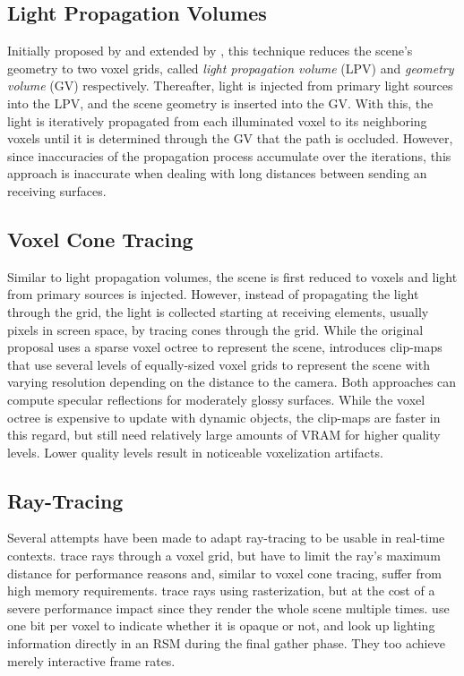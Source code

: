 \subsection{Light Propagation Volumes}

Initially proposed by \citet{Kaplanyan:2010:LPV} and extended by \citet{Kaplanyan:2010:LPV2}, this technique reduces the scene's geometry to two voxel grids, called \emph{light propagation volume} (LPV) and \emph{geometry volume} (GV) respectively. Thereafter, light is injected from primary light sources into the LPV, and the scene geometry is inserted into the GV. With this, the light is iteratively propagated from each illuminated voxel to its neighboring voxels until it is determined through the GV that the path is occluded. However, since inaccuracies of the propagation process accumulate over the iterations, this approach is inaccurate when dealing with long distances between sending an receiving surfaces.


\subsection{Voxel Cone Tracing}

Similar to light propagation volumes, the scene is first reduced to voxels and light from primary sources is injected. However, instead of propagating the light through the grid, the light is collected starting at receiving elements, usually pixels in screen space, by tracing cones through the grid.
While the original proposal \citep{Crassin:2012:OctreeVCT} uses a sparse voxel octree to represent the scene, \citet{Panteleev:2015:VXGI} introduces clip-maps that use several levels of equally-sized voxel grids to represent the scene with varying resolution depending on the distance to the camera.
Both approaches can compute specular reflections for moderately glossy surfaces. While the voxel octree is expensive to update with dynamic objects, the clip-maps are faster in this regard, but still need relatively large amounts of VRAM for higher quality levels. Lower quality levels result in noticeable voxelization artifacts.


\subsection{Ray-Tracing}

Several attempts have been made to adapt ray-tracing to be usable in real-time contexts.
\citet{Thiedemann:2011:VGI} trace rays through a voxel grid, but have to limit the ray's maximum distance for performance reasons and, similar to voxel cone tracing, suffer from high memory requirements.
\citet{Tokuyoshi:2012:pathtracingrasterization} trace rays using rasterization, but at the cost of a severe performance impact since they render the whole scene multiple times.
\citet{Chen:2016:Compactvoxels} use one bit per voxel to indicate whether it is opaque or not, and look up lighting information directly in an RSM during the final gather phase. They too achieve merely interactive frame rates.


